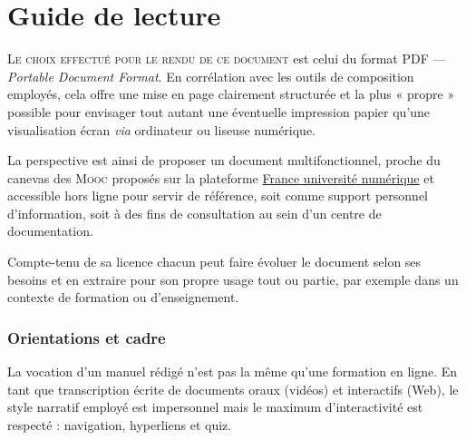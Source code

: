 \chapter*{Guide de lecture}
\label{readingguidebookmark}

\setcounter{sidenote}{0}

\lettrine{L}{e choix effectué pour le rendu de ce document} est celui du format PDF --- \textit{Portable Document Format}. En corrélation avec les outils de composition employés, cela offre une mise en page clairement structurée et la plus « propre » possible pour envisager tout autant une éventuelle impression papier qu'une visualisation écran \textit{via} ordinateur ou liseuse numérique.

La perspective est ainsi de proposer un document multi\-fonctionnel, proche du canevas des \textsc{Mooc} proposés sur la plateforme \href{www.fun-mooc.fr}{France université numérique} et accessible hors ligne pour servir de référence, soit comme support personnel d'information, soit à des fins de consultation au sein d'un centre de documentation. 

Compte-tenu de sa licence chacun peut faire évoluer le document selon ses besoins et en extraire pour son propre usage tout ou partie, par exemple dans un contexte de formation ou d'enseignement.

\subsection*{Orientations et cadre}

La vocation d'un manuel rédigé n'est pas la même qu'une formation en ligne. En tant que transcription écrite de documents oraux (vidéos) et interactifs (Web), le style narratif employé est impersonnel mais le maximum d'interactivité est respecté : navigation, hyperliens et quiz. 

